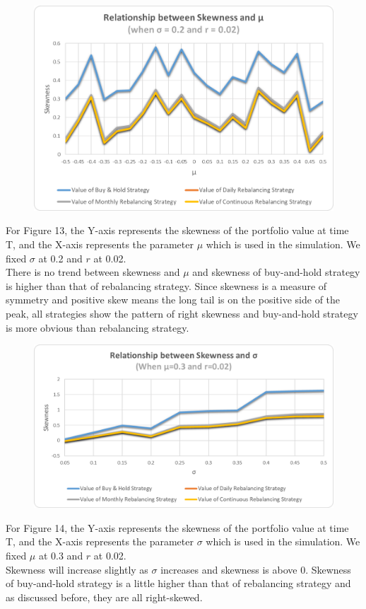 \documentclass[
10pt, %
a4paper, %
oneside, %
headinclude,footinclude, %
BCOR5mm, %
]{scrartcl}
\begin{document}
\begin{figure}[H]
	\centering
	\includegraphics[width=0.7\linewidth]{skew_mu_020_002}
	\caption{}
	\label{fig:skewmu020002}
\end{figure}
For Figure 13, the Y-axis represents the skewness of the portfolio value at time T, and the X-axis represents the parameter $\mu$ which is used in the simulation. We fixed $\sigma$ at 0.2 and $r$ at 0.02.\\

There is no trend between skewness and $\mu$ and skewness of buy-and-hold strategy is higher than that of rebalancing strategy. Since skewness is a measure of symmetry and positive skew means the long tail is on the positive side of the peak, all strategies show the pattern of right skewness and buy-and-hold strategy is more obvious than rebalancing strategy.\\

\begin{figure}[H]
	\centering
	\includegraphics[width=0.7\linewidth]{skew_sigma_030_002}
	\caption{}
	\label{fig:skewsigma030002}
\end{figure}
For Figure 14, the Y-axis represents the skewness of the portfolio value at time T, and the X-axis represents the parameter $\sigma$ which is used in the simulation. We fixed $\mu$ at 0.3 and $r$ at 0.02.\\

Skewness will increase slightly as $\sigma$ increases and skewness is above 0. Skewness of buy-and-hold strategy is a little higher than that of rebalancing strategy and as discussed before, they are all right-skewed.\\
\end{document}
